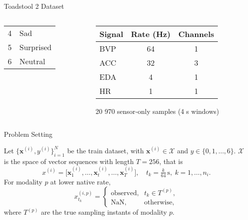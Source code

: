 \begin{frame}{Toadstool 2 Dataset}
\begin{columns}[T]
\begin{column}{0.5\textwidth}
\begin{center}
\begin{columns}[t]
	\centering\footnotesize
	\begin{tabular}{r l}
		4 & Sad        \\
		5 & Surprised  \\
		6 & Neutral
	\end{tabular}
\end{columns}


			\end{center}
			
		\end{column}
		\begin{column}{0.5\textwidth}
		\centering
		\small
		\begin{tabular}{lcc}
		\toprule
		\textbf{Signal} & \textbf{Rate (Hz)} & \textbf{Channels} \\
		\midrule
		BVP  & 64 & 1      \\
		ACC  & 32 & 3 		\\
		EDA  & 4  & 1      \\
		HR   & 1  & 1      \\
		\bottomrule
		\end{tabular}
		
		\begin{block}{}
			20 970 sensor‐only samples (4 s windows)
		\end{block}

		\end{column}
		
	\end{columns}
\end{frame}


\begin{frame}[t]{Problem Setting}

	\begin{block}{}
		Let $\{\boldsymbol{x}^{(i)}, y^(i)\}_{i=1}^{N}$ be the train dataset, with $\boldsymbol{x}^{(i)}\in\mathcal{X}$ and $y \in \{0, 1, \dots, 6\}$. $\mathcal{X}$ is the space of vector sequences with length $T = 256$, that is
		\[
		x^{(i)}
		=\bigl[\boldsymbol{x}^{(i)}_{1},\dots, \boldsymbol{x}^{(i)}_{t}, \dots,\boldsymbol{x}^{(i)}_{T}\bigr],
		\quad t_k = \tfrac{k}{64}\,\mathrm{s},\;k=1,\dots,n_i.
		\]
		For modality $p$ at lower native rate,
		\[
		x^{(i,p)}_{t_k} =
		\begin{cases}
			\text{observed}, & t_k\in T^{(p)},\\
			\mathrm{NaN},    & \text{otherwise},
		\end{cases}
		\]
		where $T^{(p)}$ are the true sampling instants of modality $p$.
	\end{block}
\end{frame}
